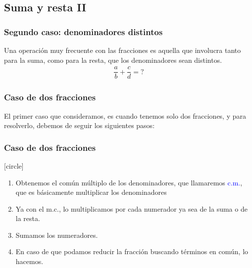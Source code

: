 \subsection{Suma y resta II}

\begin{frame}
\frametitle{Segundo caso: denominadores distintos}
Una operación muy frecuente con las fracciones es aquella que involucra tanto para la suma, como para la resta, que los denominadores sean distintos.
\pause
\begin{align*}
\dfrac{a}{b} + \dfrac{c}{d} = ?
\end{align*}
\end{frame}
\begin{frame}
\frametitle{Caso de dos fracciones}
El primer caso que consideramos, es cuando tenemos solo dos fracciones, y para resolverlo, debemos de seguir los siguientes pasos:
\end{frame}
\begin{frame}
\frametitle{Caso de dos fracciones}
[circle]
\begin{enumerate}[<+->]
\item Obtenemos el común múltiplo de los denominadores, que llamaremos \textcolor{blue}{c.m.}, que es básicamente multiplicar los denominadores
\item Ya con el m.c., lo multiplicamos por cada numerador ya sea de la suma o de la resta.
\item Sumamos los numeradores.
\item En caso de que podamos reducir la fracción buscando términos en común, lo hacemos.
\end{enumerate}
\end{frame}
